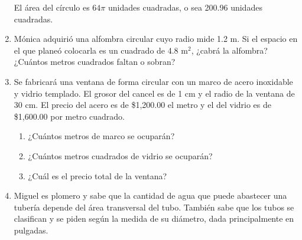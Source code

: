 \documentclass[11pt]{book}
\begin{document}
\begin{enumerate}
        El área del círculo es $64\pi$ unidades cuadradas, o sea 200.96 unidades cuadradas.

  \item Mónica adquirió una alfombra circular cuyo radio mide 1.2 m. Si el espacio en el que planeó colocarla es un cuadrado de 4.8 m$^2$, ¿cabrá la alfombra? ¿Cuántos metros cuadrados faltan o sobran?

  \item Se fabricará una ventana de forma circular con un marco de acero inoxidable y vidrio templado. El grosor del cancel es de 1 cm y el radio de la ventana de 30 cm. El precio del acero es de \$1,200.00 el metro y el del vidrio es de \$1,600.00 por metro cuadrado.
        \begin{enumerate}
          \item ¿Cuántos metros de marco se ocuparán?
          \item ¿Cuántos metros cuadrados de vidrio se ocuparán?
          \item ¿Cuál es el precio total de la ventana?
        \end{enumerate}

  \item Miguel es plomero y sabe que la cantidad de agua que puede abastecer una tubería depende del área transversal del tubo. También sabe que los tubos se clasifican y se piden según la medida de su diámetro, dada principalmente en pulgadas.


\end{enumerate}
\end{document}
